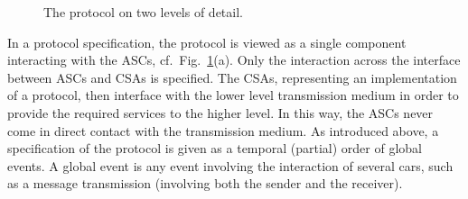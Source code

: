 \documentclass{sig-alternate}
\newcommand{\fig}[1]{Fig.\ \ref{fig:#1}}
\newcommand{\figvspace}{\vspace{-0.2in}}
\newcommand{\figsmallvspace}{\vspace{-0.1in}}
\begin{document}
\begin{figure}
\centering
{}
    \hspace{0.1cm}
\figsmallvspace
\caption{The protocol on two levels of detail.}
\label{fig:protocol}
\figvspace
\end{figure}

In a protocol specification, the protocol is viewed as a single component interacting with the ASCs, cf.\ \fig{protocol}(a). Only the interaction across the interface between ASCs and CSAs is specified. The CSAs, representing an implementation of a protocol, then interface with the lower level transmission medium in order to provide the required services to the higher level. In this way, the ASCs never come in direct contact with the transmission medium. As introduced above, a specification of the protocol is given as a temporal (partial) order of global events. A global event is any event involving the interaction of several cars, such as a message transmission (involving both the sender and the receiver).
\end{document}

